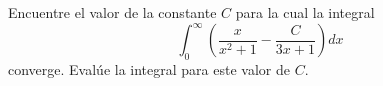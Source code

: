\item Encuentre el valor de la constante $C$ para la cual la integral
    \[ \int_{0}^{\infty} \left( \frac{x}{x^2 + 1} - \frac{C}{3x + 1} \right) dx \]
    converge. Evalúe la integral para este valor de $C$.
